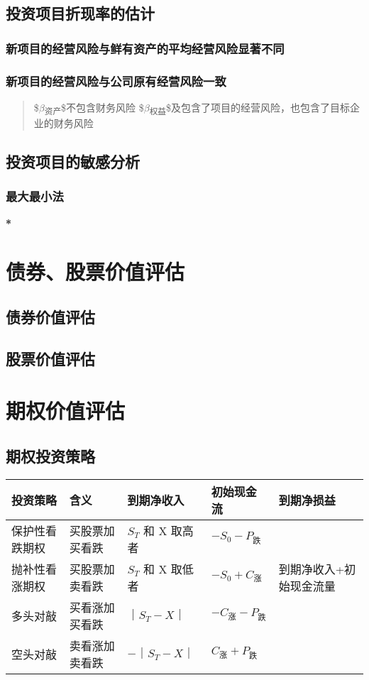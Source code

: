 \documentclass[11pt]{article}
\begin{document}
\subsection{投资项目折现率的估计}
\label{sec:org2d604f6}
\subsubsection{新项目的经营风险与鲜有资产的平均经营风险显著不同}
\label{sec:orgf172a79}
\subsubsection{新项目的经营风险与公司原有经营风险一致}
\label{sec:org7c9a81e}
\begin{quote}
\$\(\beta\)\textsubscript{资产}\$不包含财务风险
\$\(\beta\)\textsubscript{权益}\$及包含了项目的经营风险，也包含了目标企业的财务风险
\end{quote}
\subsection{投资项目的敏感分析}
\label{sec:orgd2ce0a6}
\subsubsection{最大最小法}
\label{sec:org1cd73c5}
\textbf{*}
\section{债券、股票价值评估}
\label{sec:org4c68e7e}
\subsection{债券价值评估}
\label{sec:org161a61a}
\subsection{股票价值评估}
\label{sec:org86fb08e}
\section{期权价值评估}
\label{sec:org88d0357}
\subsection{期权投资策略}
\label{sec:orgd290f60}
\begin{center}
\begin{tabular}{lllll}
投资策略 & 含义 & 到期净收入 & 初始现金流 & 到期净损益\\
\hline
保护性看跌期权 & 买股票加买看跌 & \(S_{T}\) 和 X 取高者 & \(-S_{0}-P_{跌}\) & \\
抛补性看涨期权 & 买股票加卖看跌 & \(S_{T}\) 和 X 取低者 & \(-S_{0}+C_{涨}\) & 到期净收入+初始现金流量\\
多头对敲 & 买看涨加买看跌 & \(｜S_{T}-X｜\) & \(-C_{涨}-P_{跌}\) & \\
空头对敲 & 卖看涨加卖看跌 & \(-｜S_{T}-X｜\) & \(C_{涨}+P_{跌}\) & \\
\end{tabular}
\end{center}
\end{document}
